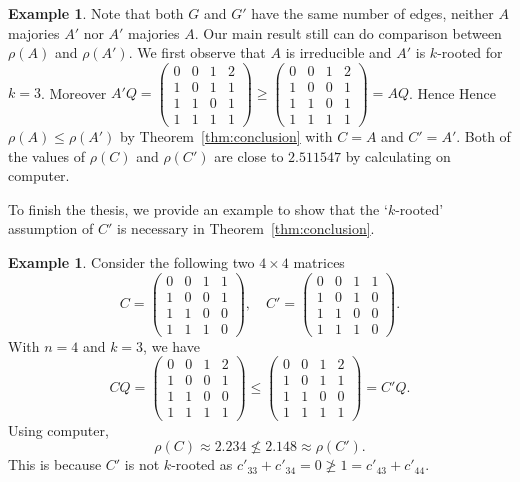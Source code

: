 \documentclass[12pt, a4paper]{article}
\theoremstyle{plain}
\theoremstyle{definition}
\newtheorem{exam}[thm]{Example}
\begin{document}
\begin{exam}
Note that both $G$ and $G'$ have the same number of edges, 
neither $A$ majories $A'$ nor $A'$ majories $A$. Our main result still can do comparison between 
$\rho(A)$ and $\rho(A')$. 
We first observe that $A$ is irreducible and $A'$ is $k$-rooted for $k=3$. Moreover 
$A'Q=\begin{pmatrix}
    0 & 0 & 1 & 2\\
    1 & 0 & 1 & 1\\
    1 & 1 & 0 & 1\\
    1 & 1 & 1 & 1
    \end{pmatrix}\geq \begin{pmatrix}
    0 & 0 & 1 & 2\\
    1 & 0 & 0 & 1\\
    1 & 1 & 0 & 1\\
    1 & 1 & 1 & 1
    \end{pmatrix}=AQ$. 
Hence Hence $\rho(A)\leq\rho(A')$ by Theorem~\ref{thm:conclusion} with $C=A$ and $C'=A'$. 
Both of the values of $\rho(C)$ and $\rho(C')$ are close to $2.511547$ by  calculating on computer. 
\end{exam}

To finish the thesis, we provide an example to show that the `$k$-rooted' assumption of $C'$ is necessary in Theorem~\ref{thm:conclusion}. 

\begin{exam}
    Consider the following two $4\times 4$ matrices
    $$C=\begin{pmatrix}
    0 & 0 & 1 & 1\\
    1 & 0 & 0 & 1\\
    1 & 1 & 0 & 0\\
    1 & 1 & 1 & 0
    \end{pmatrix},\quad C'=\begin{pmatrix}
    0 & 0 & 1 & 1\\
    1 & 0 & 1 &  0\\
    1 & 1 & 0 & 0\\
    1 & 1 & 1 & 0
    \end{pmatrix}.$$
    With $n=4$ and $k=3$, we have  
    $$CQ=\begin{pmatrix}
    0 & 0 & 1 & 2\\
    1 & 0 & 0 & 1\\
    1 & 1 & 0 & 0\\
    1 & 1 & 1 & 1
    \end{pmatrix}\leq \begin{pmatrix}
    0 & 0 & 1 & 2\\
    1 & 0 & 1 & 1\\
    1 & 1 & 0 & 0\\
    1 & 1 & 1 & 1
    \end{pmatrix}=C'Q.$$
Using computer, 
    $$\rho(C)\approx 2.234\not\leq 2.148\approx \rho(C').$$
    This is because $C'$ is not $k$-rooted as $c'_{33}+c'_{34}=0\not\geq 1=c'_{43}+c'_{44}$.

\end{exam}
\end{document}
